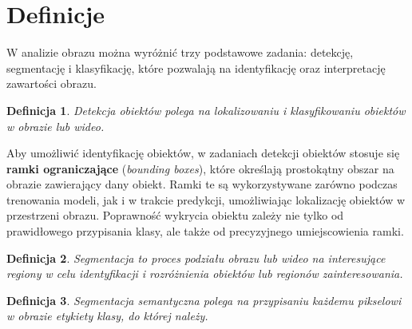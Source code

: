\documentclass[licencjacka]{pracamgr}
\newtheorem{defi}{Definicja}[section]
\begin{document}



\section{Definicje}

W analizie obrazu można wyróżnić trzy podstawowe zadania: detekcję, segmentację i klasyfikację, które pozwalają na identyfikację oraz interpretację zawartości obrazu.

\begin{defi}\label{detekcja}
    \emph{Detekcja obiektów} polega na lokalizowaniu i klasyfikowaniu obiektów w obrazie lub wideo.
\end{defi}

Aby umożliwić identyfikację obiektów, w zadaniach detekcji obiektów stosuje się \textbf{ramki ograniczające} (\emph{bounding boxes}), które określają prostokątny obszar na obrazie zawierający dany obiekt. Ramki te są wykorzystywane zarówno podczas trenowania modeli, jak i w trakcie predykcji, umożliwiając lokalizację obiektów w przestrzeni obrazu. Poprawność wykrycia obiektu zależy nie tylko od prawidłowego przypisania klasy, ale także od precyzyjnego umiejscowienia ramki. 

\begin{defi}\label{seg}
    \emph{Segmentacja} to proces podziału obrazu lub wideo na interesujące regiony w celu identyfikacji i rozróżnienia obiektów lub regionów zainteresowania.
\end{defi}

\begin{defi}\label{segmentacja}
    \emph{Segmentacja semantyczna} polega na przypisaniu każdemu pikselowi w obrazie etykiety klasy, do której należy.
\end{defi}
\end{document}
